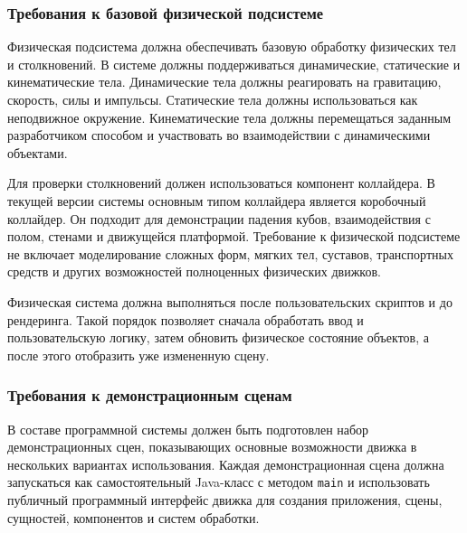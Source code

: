 \subsubsection{Требования к базовой физической подсистеме}

Физическая подсистема должна обеспечивать базовую обработку физических тел и столкновений. В системе должны поддерживаться динамические, статические и кинематические тела. Динамические тела должны реагировать на гравитацию, скорость, силы и импульсы. Статические тела должны использоваться как неподвижное окружение. Кинематические тела должны перемещаться заданным разработчиком способом и участвовать во взаимодействии с динамическими объектами.

Для проверки столкновений должен использоваться компонент коллайдера. В текущей версии системы основным типом коллайдера является коробочный коллайдер. Он подходит для демонстрации падения кубов, взаимодействия с полом, стенами и движущейся платформой. Требование к физической подсистеме не включает моделирование сложных форм, мягких тел, суставов, транспортных средств и других возможностей полноценных физических движков.

Физическая система должна выполняться после пользовательских скриптов и до рендеринга. Такой порядок позволяет сначала обработать ввод и пользовательскую логику, затем обновить физическое состояние объектов, а после этого отобразить уже измененную сцену.

\subsubsection{Требования к демонстрационным сценам}

В составе программной системы должен быть подготовлен набор демонстрационных сцен, показывающих основные возможности движка в нескольких вариантах использования. Каждая демонстрационная сцена должна запускаться как самостоятельный Java-класс с методом \texttt{main} и использовать публичный программный интерфейс движка для создания приложения, сцены, сущностей, компонентов и систем обработки.

